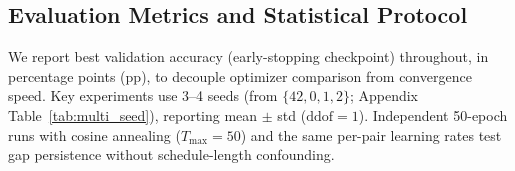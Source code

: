 \subsection{Evaluation Metrics and Statistical Protocol}

We report best validation accuracy (early-stopping checkpoint) throughout, in percentage points (pp), to decouple optimizer comparison from convergence speed.
Key experiments use 3--4 seeds (from $\{42, 0, 1, 2\}$; Appendix Table~\ref{tab:multi_seed}), reporting mean $\pm$ std ($\text{ddof}=1$).
Independent 50-epoch runs with cosine annealing ($T_{\max} = 50$) and the same per-pair learning rates test gap persistence without schedule-length confounding.